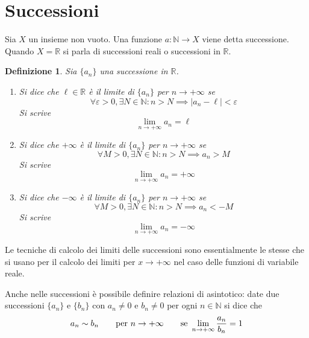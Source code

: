\documentclass[11pt]{book}
\newtheorem{definition}{Definizione}[chapter]
\begin{document}
\section{Successioni}
Sia $X$ un insieme non vuoto. Una funzione $a:\mathbb{N}\rightarrow X$ viene detta successione. Quando $X=\mathbb{R}$ si 
parla di successioni reali o successioni in $\mathbb{R}$.
\begin{definition}
    Sia $\{a_n\}$ una successione in $\mathbb{R}$.
    \begin{enumerate}
        \item Si dice che $\ell\in\mathbb{R}$ è il limite di $\{a_n\}$ per $n\rightarrow +\infty$ se 
        \begin{equation*}
            \forall\varepsilon>0,\exists N\in\mathbb{N}:n>N\implies|a_n-\ell|<\varepsilon
        \end{equation*}
        Si scrive 
        \begin{equation*}
            \lim_{n\rightarrow +\infty}a_n=\ell
        \end{equation*}
        \item Si dice che $+\infty$ è il limite di $\{a_n\}$ per $n\rightarrow +\infty$ se 
        \begin{equation*}
            \forall M>0,\exists N\in\mathbb{N}:n>N\implies a_n>M
        \end{equation*}
        Si scrive 
        \begin{equation*}
            \lim_{n\rightarrow +\infty}a_n=+\infty
        \end{equation*}
        \item Si dice che $-\infty$ è il limite di $\{a_n\}$ per $n\rightarrow +\infty$ se
        \begin{equation*}
            \forall M>0,\exists N\in\mathbb{N}:n>N\implies a_n<-M
        \end{equation*}
        Si scrive 
        \begin{equation*}
            \lim_{n\rightarrow +\infty}a_n=-\infty
        \end{equation*}
    \end{enumerate}
\end{definition}
Le tecniche di calcolo dei limiti delle successioni sono essentialmente le stesse che si usano per il calcolo dei limiti 
per $x\rightarrow +\infty$ nel caso delle funzioni di variabile reale.

Anche nelle successioni è possibile definire relazioni di asintotico: date due successioni $\{a_n\}$ e $\{b_n\}$ con 
$a_n\neq 0$ e $b_n\neq 0$ per ogni $n\in\mathbb{N}$ si dice che 
\begin{equation*}
    a_n\sim b_n\qquad\textnormal{per }n\rightarrow +\infty\qquad\textnormal{se }\lim_{n\rightarrow +\infty}\frac{a_n}{b_n}=1
\end{equation*}
\end{document}

